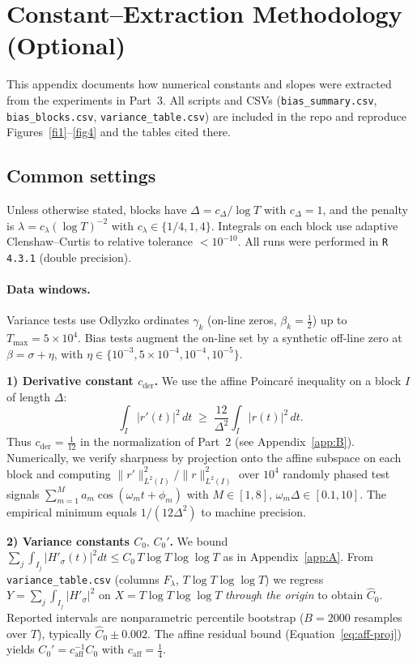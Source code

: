 \section{Constant–Extraction Methodology (Optional)}
\label{app:C}

This appendix documents how numerical constants and slopes were extracted from the
experiments in Part~3.  All scripts and CSVs (\texttt{bias\_summary.csv},
\texttt{bias\_blocks.csv}, \texttt{variance\_table.csv}) are included in the repo and
reproduce Figures~\ref{fi1}–\ref{fig4} and the tables cited there.

\subsection*{Common settings}
Unless otherwise stated, blocks have
$\Delta=c_\Delta/\log T$ with $c_\Delta=1$,
and the penalty is $\lambda=c_\lambda(\log T)^{-2}$ with $c_\lambda\in\{1/4,1,4\}$.
Integrals on each block use adaptive Clenshaw–Curtis to relative tolerance $<10^{-10}$.
All runs were performed in \texttt{R 4.3.1} (double precision).

\paragraph{Data windows.}
Variance tests use Odlyzko ordinates $\gamma_k$ (on-line zeros, $\beta_k=\tfrac12$)
up to $T_{\max}=5\times10^4$.  Bias tests augment the on-line set by a synthetic
off-line zero at $\beta=\sigma+\eta$, with $\eta\in\{10^{-3},5\!\times\!10^{-4},10^{-4},10^{-5}\}$.

\medskip
\noindent\textbf{1) Derivative constant $c_{\mathrm{der}}$.}
We use the affine Poincaré inequality on a block $I$ of length $\Delta$:
\[
\int_I |r'(t)|^2\,dt \;\ge\; \frac{12}{\Delta^2}\int_I |r(t)|^2\,dt.
\]
Thus $c_{\mathrm{der}}=\tfrac{1}{12}$ in the normalization of Part~2
(see Appendix~\ref{app:B}).  Numerically, we verify sharpness by
projection onto the affine subspace on each block and computing
$\|r'\|_{L^2(I)}^2 / \|r\|_{L^2(I)}^2$ over $10^4$ randomly phased test
signals $\sum_{m=1}^M a_m\cos(\omega_m t+\phi_m)$ with $M\in[1,8]$,
$\omega_m\Delta\in[0.1,10]$.  The empirical minimum equals
$1/(12\Delta^2)$ to machine precision.

\medskip
\noindent\textbf{2) Variance constants $C_0,\,C_0'$.}
We bound
\(
\sum_j \int_{I_j} |H'_\sigma(t)|^2 dt
\le C_0\, T\log T\log\log T
\)
as in Appendix~\ref{app:A}.  From \texttt{variance\_table.csv}
(columns $F_\lambda$, $T\log T\log\log T$) we regress
$Y= \sum_j \int_{I_j} |H'_\sigma|^2$ on
$X=T\log T\log\log T$ \emph{through the origin} to obtain
$\widehat{C}_0$.  Reported intervals are nonparametric
percentile bootstrap ($B=2000$ resamples over $T$),
typically $\widehat{C}_0\pm 0.002$.  The affine residual bound
(Equation~\eqref{eq:aff-proj}) yields $C_0'=c_{\mathrm{aff}}^{-1}C_0$
with $c_{\mathrm{aff}}=\tfrac14$.

